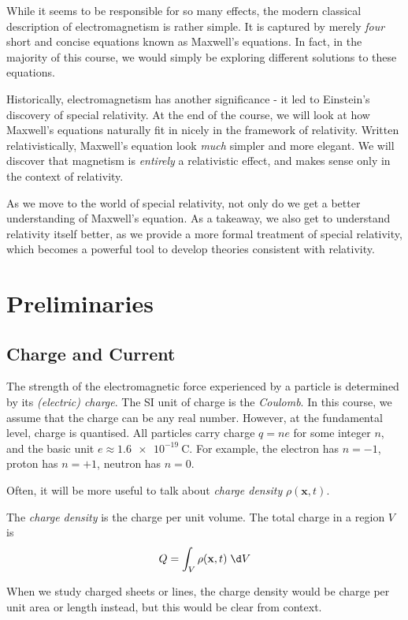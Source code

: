 \documentclass[a4paper]{article}
\begin{document}
While it seems to be responsible for so many effects, the modern classical description of electromagnetism is rather simple. It is captured by merely \emph{four} short and concise equations known as Maxwell's equations. In fact, in the majority of this course, we would simply be exploring different solutions to these equations.

Historically, electromagnetism has another significance - it led to Einstein's discovery of special relativity. At the end of the course, we will look at how Maxwell's equations naturally fit in nicely in the framework of relativity. Written relativistically, Maxwell's equation look \emph{much} simpler and more elegant. We will discover that magnetism is \emph{entirely} a relativistic effect, and makes sense only in the context of relativity.

As we move to the world of special relativity, not only do we get a better understanding of Maxwell's equation. As a takeaway, we also get to understand relativity itself better, as we provide a more formal treatment of special relativity, which becomes a powerful tool to develop theories consistent with relativity.

\section{Preliminaries}
\subsection{Charge and Current}
The strength of the electromagnetic force experienced by a particle is determined by its \emph{(electric) charge}. The SI unit of charge is the \emph{Coulomb}. In this course, we assume that the charge can be any real number. However, at the fundamental level, charge is quantised. All particles carry charge $q = ne$ for some integer $n$, and the basic unit $e \approx \SI{1.6e-19}{\coulomb}$. For example, the electron has $n = -1$, proton has $n = +1$, neutron has $n = 0$.

Often, it will be more useful to talk about \emph{charge density} $\rho(\mathbf{x}, t)$.
\begin{defi}
  The \emph{charge density} is the charge per unit volume. The total charge in a region $V$ is
  \[
    Q = \int_V \rho(\mathbf{x}, t)\; \d V
  \]
\end{defi}
When we study charged sheets or lines, the charge density would be charge per unit area or length instead, but this would be clear from context.
\end{document}
